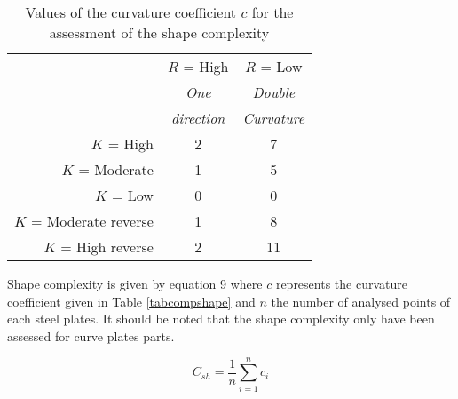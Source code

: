 \begin{table}
\caption{Values of the curvature coefficient $c$ for the assessment of the shape complexity}
\label{tab:compshape}
\begin{center}
\begin{tabular}{rcc}
           &   $R$ = High &    $R$ = Low \\
 &  {\it One} & {\it Double} \\
 & {\it direction} & {\it Curvature} \\
  $K$ = High &          2 &          7 \\
$K$ = Moderate &          1 &          5 \\
   $K$ = Low &          0 &          0 \\
$K$ = Moderate reverse &          1 &          8 \\
$K$ = High reverse &          2 &         11 \\
\end{tabular}
\end{center}
\end{table}


Shape complexity is given by equation 9 where $c$ represents the curvature coefficient given in Table \ref{tabcompshape} and $n$ the number of analysed points of each steel plates. It should be noted that the shape complexity only have been assessed for curve plates parts.


\begin{equation}
C_{sh} = \frac{1}{n} \sum_{i=1}^{n} c_i
\end{equation}